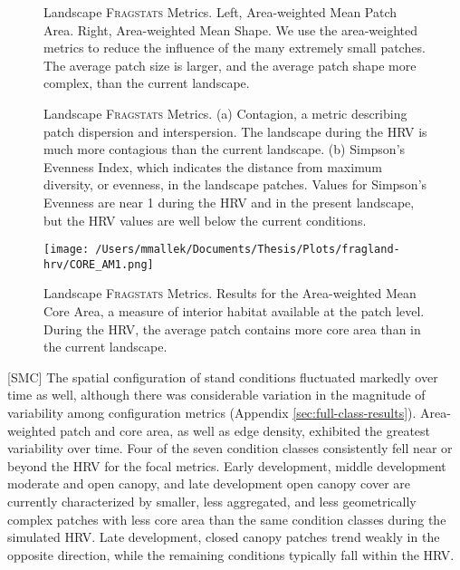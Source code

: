 \clearpage
\begin{figure}[!htbp]
  \centering
\caption{Landscape \textsc{Fragstats} Metrics. Left, Area-weighted Mean Patch Area. Right, Area-weighted Mean Shape. We use the area-weighted metrics to reduce the influence of the many extremely small patches. The average patch size is larger, and the average patch shape more complex, than the current landscape.} 
\label{fig:fragland_areashape}
\end{figure}

\begin{figure}[!htbp]
  \centering
\caption{Landscape \textsc{Fragstats} Metrics. (a) Contagion, a metric describing patch dispersion and interspersion. The landscape during the HRV is much more contagious than the current landscape. (b) Simpson's Evenness Index, which indicates the distance from maximum diversity, or evenness, in the landscape patches. Values for Simpson's Evenness are near 1 during the HRV and in the present landscape, but the HRV values are well below the current conditions.} 
\label{fig:fragland_contagsiei}
\end{figure}

\begin{figure}[!htbp]
  \centering
  \texttt{[image: /Users/mmallek/Documents/Thesis/Plots/fragland-hrv/CORE\_AM1.png]}
\caption{Landscape \textsc{Fragstats} Metrics. Results for the Area-weighted Mean Core Area, a measure of interior habitat available at the patch level. During the HRV, the average patch contains more core area than in the current landscape.} 
\label{fig:fragland_core}
\end{figure}


[SMC] The spatial configuration of stand conditions fluctuated markedly over time as well, although there was considerable variation in the magnitude of variability among configuration metrics (Appendix \ref{sec:full-class-results}). Area-weighted patch and core area, as well as edge density, exhibited the greatest variability over time. Four of the seven condition classes consistently fell near or beyond the HRV for the focal metrics. Early development, middle development moderate and open canopy, and late development open canopy cover are currently characterized by smaller, less aggregated, and less geometrically complex patches with less core area than the same condition classes during the simulated HRV. Late development, closed canopy patches trend weakly in the opposite direction, while the remaining conditions typically fall within the HRV.